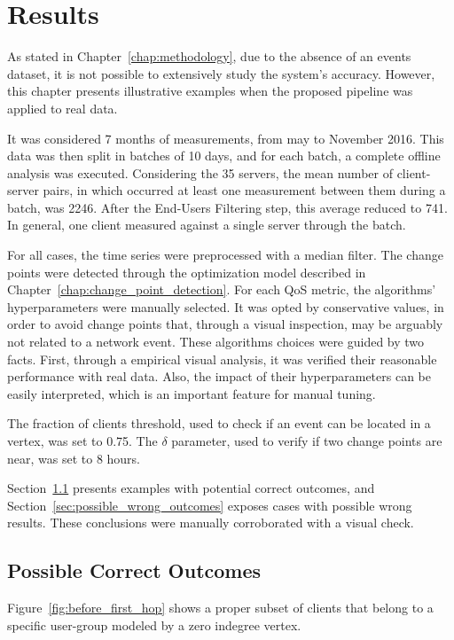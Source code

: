 \chapter{Results}
\label{chap:results}

As stated in Chapter~\ref{chap:methodology}, due to the absence of an events
dataset, it is not possible to extensively study the system's accuracy.
However, this chapter presents illustrative examples when the proposed pipeline
was applied to real data.

It was considered 7 months of measurements, from may to November 2016.
This data was then split in batches of 10 days, and for each batch,
a complete offline analysis was executed.
Considering the 35 servers, the mean number of client-server
pairs, in which occurred at least one measurement between them during a batch,
was 2246.
After the End-Users Filtering step, this average reduced to 741.
In general, one client measured against a single server through the batch.

For all cases, the time series were preprocessed with a median filter.
The change points were detected through the optimization model described in
Chapter~\ref{chap:change_point_detection}.
For each QoS metric, the algorithms' hyperparameters were manually selected.
It was opted by conservative values, in order to avoid change points that,
through a visual inspection, may be arguably not related to a network event.
These algorithms choices were guided by two facts.
First, through a empirical visual analysis,
it was verified their reasonable performance with real data.
Also, the impact of their hyperparameters can be easily interpreted, which is
an important feature for manual tuning.

The fraction of clients threshold, used to check if an event can be
located in a vertex, was set to 0.75. The $\delta$ parameter, used to verify if
two change points are near, was set to 8 hours.

Section~\ref{sec:possible_correct_outcomes} presents examples with potential
correct outcomes, and Section~\ref{sec:possible_wrong_outcomes} exposes
cases with possible wrong results. These conclusions were manually corroborated
with a visual check.

\section{Possible Correct Outcomes}
\label{sec:possible_correct_outcomes}

Figure~\ref{fig:before_first_hop} shows a proper subset of clients that belong
to a specific user-group modeled by a zero indegree vertex.

